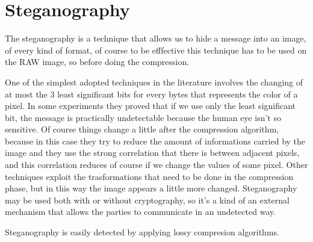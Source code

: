 \chapter{Steganography}

The steganography is a technique that allows us to hide a message into an image, of every kind of format, of course to be efffective this technique has to be used on the RAW image, so before doing the compression. 

One of the simplest adopted techniques in the literature involves the changing of at most the 3 least significant bits for every bytes that represents the color of a pixel.  
In some experiments they proved that if we use only the least significant bit, the message is practically undetectable because the human eye isn't so sensitive. 
Of course things change a little after the compression algorithm, because in this case they try to reduce the amount of informations carried by the image and they use the strong correlation that there is between adjacent pixels, and this correlation reduces of course if we change the values of some pixel. 
Other techniques exploit the trasformations that need to be done in the compression phase, but in this way the image appears a little more changed.
Steganography may be used both with or without cryptography, so it's a kind of an external mechanism that allows the parties to communicate in an undetected way. 

Steganography is easily detected by applying lossy compresion algorithms.